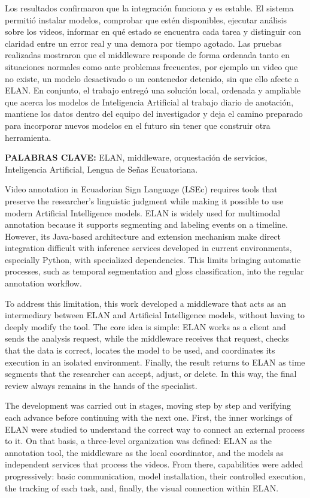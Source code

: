 Los resultados confirmaron que la integración funciona y es estable. El sistema permitió instalar modelos, comprobar que estén disponibles, ejecutar análisis sobre los videos, informar en qué estado se encuentra cada tarea y distinguir con claridad entre un error real y una demora por tiempo agotado. Las pruebas realizadas mostraron que el middleware responde de forma ordenada tanto en situaciones normales como ante problemas frecuentes, por ejemplo un video que no existe, un modelo desactivado o un contenedor detenido, sin que ello afecte a ELAN. En conjunto, el trabajo entregó una solución local, ordenada y ampliable que acerca los modelos de Inteligencia Artificial al trabajo diario de anotación, mantiene los datos dentro del equipo del investigador y deja el camino preparado para incorporar nuevos modelos en el futuro sin tener que construir otra herramienta.

\textbf{PALABRAS CLAVE:} ELAN, middleware, orquestación de servicios, Inteligencia Artificial, Lengua de Señas Ecuatoriana.

Video annotation in Ecuadorian Sign Language (LSEc) requires tools that preserve the researcher's linguistic judgment while making it possible to use modern Artificial Intelligence models. ELAN is widely used for multimodal annotation because it supports segmenting and labeling events on a timeline. However, its Java-based architecture and extension mechanism make direct integration difficult with inference services developed in current environments, especially Python, with specialized dependencies. This limits bringing automatic processes, such as temporal segmentation and gloss classification, into the regular annotation workflow.

To address this limitation, this work developed a middleware that acts as an intermediary between ELAN and Artificial Intelligence models, without having to deeply modify the tool. The core idea is simple: ELAN works as a client and sends the analysis request, while the middleware receives that request, checks that the data is correct, locates the model to be used, and coordinates its execution in an isolated environment. Finally, the result returns to ELAN as time segments that the researcher can accept, adjust, or delete. In this way, the final review always remains in the hands of the specialist.

The development was carried out in stages, moving step by step and verifying each advance before continuing with the next one. First, the inner workings of ELAN were studied to understand the correct way to connect an external process to it. On that basis, a three-level organization was defined: ELAN as the annotation tool, the middleware as the local coordinator, and the models as independent services that process the videos. From there, capabilities were added progressively: basic communication, model installation, their controlled execution, the tracking of each task, and, finally, the visual connection within ELAN.

